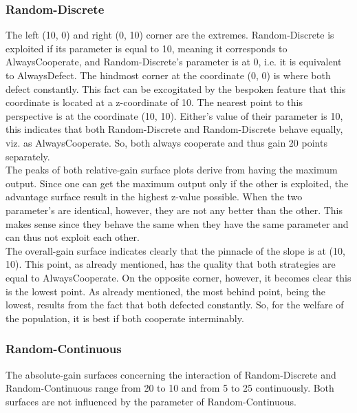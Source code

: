 \documentclass{article}
\begin{document}
\subsubsection*{Random-Discrete}
		The left (10, 0) and right (0, 10) corner are the extremes.
		Random-Discrete is exploited if its parameter is equal to 10, meaning it corresponds to AlwaysCooperate, and Random-Discrete's parameter is at 0, i.e. it is equivalent to AlwaysDefect.
		The hindmost corner at the coordinate (0, 0) is where both defect constantly.
		This fact can be excogitated by the bespoken feature that this coordinate is located at a z-coordinate of 10.
		The nearest point to this perspective is at the coordinate (10, 10).
		Either's value of their parameter is 10, this indicates that both Random-Discrete and Random-Discrete behave equally, viz. as AlwaysCooperate.
		So, both always cooperate and thus gain 20 points separately.\\

		The peaks of both relative-gain surface plots derive from having the maximum output.
		Since one can get the maximum output only if the other is exploited, the advantage surface result in the highest z-value possible.
		When the two parameter's are identical, however, they are not any better than the other.
		This makes sense since they behave the same when they have the same parameter and can thus not exploit each other.\\

		The overall-gain surface indicates clearly that the pinnacle of the slope is at (10, 10).
		This point, as already mentioned, has the quality that both strategies are equal to AlwaysCooperate.
		On the opposite corner, however, it becomes clear this is the lowest point.
		As already mentioned, the most behind point, being the lowest, results from the fact that both defected constantly.
		So, for the welfare of the population, it is best if both cooperate interminably.\\


\subsubsection*{Random-Continuous}
		The absolute-gain surfaces concerning the interaction of Random-Discrete and Random-Continuous range from 20 to 10 and from 5 to 25 continuously.
		Both surfaces are not influenced by the parameter of Random-Continuous.\\
\end{document}
